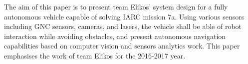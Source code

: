 The aim of this paper is to present team Elikos’ system design for a fully autonomous vehicle capable of solving IARC mission 7a. Using various sensors including GNC sensors, cameras, and lasers, the vehicle shall be able of robot interaction while avoiding obstacles, and present autonomous navigation capabilities based on computer vision and sensors analytics work. This paper emphasises the work of team Elikos for the 2016-2017 year.